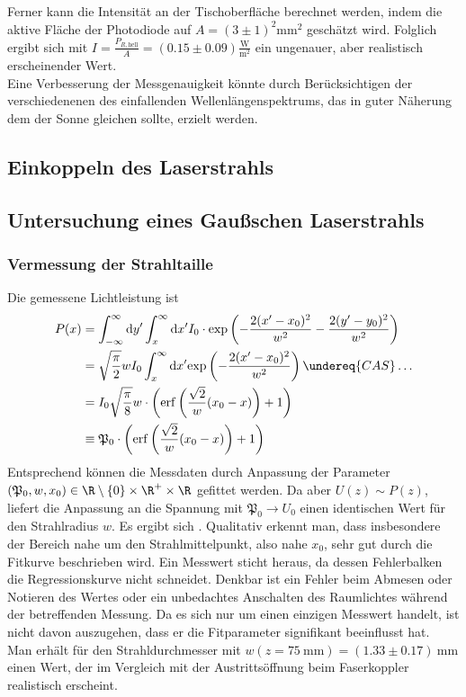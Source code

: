 \documentclass[11pt,a4paper,oneside]{scrartcl}
\begin{document}
Ferner kann die Intensität an der Tischoberfläche berechnet werden, indem die aktive Fläche der Photodiode auf $A=(3\pm1)^2\mathrm{mm}^2$ geschätzt wird. Folglich ergibt sich mit $I=\frac{P_{R,\mathrm{hell}}}{A}=(0.15\pm0.09)\frac{\mathrm{W}}{\mathrm m^2}$ ein ungenauer, aber realistisch erscheinender Wert. \\
Eine Verbesserung der Messgenauigkeit könnte durch Berücksichtigen der verschiedenenen des einfallenden Wellenlängenspektrums, das in guter Näherung dem der Sonne gleichen sollte, erzielt werden. 
\subsection{Einkoppeln des Laserstrahls}
\subsection{Untersuchung eines Gaußschen Laserstrahls}
\subsubsection{Vermessung der Strahltaille}\label{Auswertung Vermessung der Strahltaille}
Die gemessene Lichtleistung ist 
\begin{align}
P(x)&=\int_{-\infty}^\infty \mathrm dy^\prime \int_x^\infty \mathrm dx^\prime I_0\cdot\mathrm{exp}\left(-\frac{2(x^\prime-x_0)^2}{w^2}-\frac{2(y^\prime-y_0)^2}{w^2}\right) \\ \quad& = \sqrt{\frac{\pi}{2}}wI_0\int_x^\infty \mathrm dx^\prime \mathrm{exp}\left(-\frac{2(x^\prime-x_0)^2}{w^2}\right) \undereq{CAS}\hdots \\ \quad& =I_0\sqrt{\frac{\pi}{8}}w\cdot\left(\mathrm{erf}\left(\frac{\sqrt{2}}{w}(x_0-x)\right)+1\right)\\ \quad& \equiv \mathfrak{P}_0\cdot\left(\mathrm{erf}\left(\frac{\sqrt{2}}{w}(x_0-x)\right)+1\right)
\end{align}
Entsprechend können die Messdaten durch Anpassung der Parameter $(\mathfrak P_0,w,x_0)\in \R\setminus\{0\}\times\R^+\times\R$ gefittet werden. Da aber $U(z)\sim P(z)$, liefert die Anpassung an die Spannung mit $\mathfrak P_0\rightarrow U_0$ einen identischen Wert für den Strahlradius $w$.
Es ergibt sich . Qualitativ erkennt man, dass insbesondere der Bereich nahe um den Strahlmittelpunkt, also nahe $x_0$, sehr gut durch die Fitkurve beschrieben wird. Ein Messwert sticht heraus, da dessen Fehlerbalken die Regressionskurve nicht schneidet. Denkbar ist ein Fehler beim Abmesen oder Notieren des Wertes oder ein unbedachtes Anschalten des Raumlichtes während der betreffenden Messung. Da es sich nur um einen einzigen Messwert handelt, ist nicht davon auszugehen, dass er die Fitparameter signifikant beeinflusst hat. \\
Man erhält für den Strahldurchmesser mit $w(z=75\ \mathrm{mm})=(1.33\pm0.17)\ \mathrm{mm}$ einen Wert, der im Vergleich mit der Austrittsöffnung beim Faserkoppler realistisch erscheint.
\end{document}
